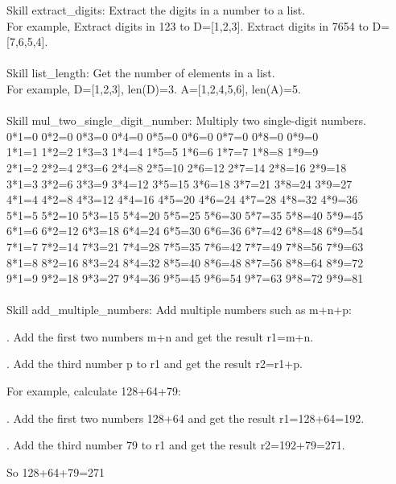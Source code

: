 \documentclass{article} \usepackage{arxiv}
\begin{document}
\newpage

\begin{tcolorbox}[title = {Skills for Multiplication}, colback = Apricot!25!white, colframe = BrickRed!75!black] 
Skill extract\_digits: Extract the digits in a number to a list.  \\
For example, Extract digits in 123 to D=[1,2,3]. Extract digits in 7654 to D=[7,6,5,4]. \\ \\

Skill list\_length: Get the number of elements in a list.  \\
For example, D=[1,2,3], len(D)=3. A=[1,2,4,5,6], len(A)=5. \\ \\

Skill mul\_two\_single\_digit\_number: Multiply two single-digit numbers.  \\
0*1=0 0*2=0 0*3=0 0*4=0 0*5=0 0*6=0 0*7=0 0*8=0 0*9=0 \\
1*1=1 1*2=2 1*3=3 1*4=4 1*5=5 1*6=6 1*7=7 1*8=8 1*9=9 \\
2*1=2 2*2=4 2*3=6 2*4=8 2*5=10 2*6=12 2*7=14 2*8=16 2*9=18 \\
3*1=3 3*2=6 3*3=9 3*4=12 3*5=15 3*6=18 3*7=21 3*8=24 3*9=27 \\
4*1=4 4*2=8 4*3=12 4*4=16 4*5=20 4*6=24 4*7=28 4*8=32 4*9=36 \\
5*1=5 5*2=10 5*3=15 5*4=20 5*5=25 5*6=30 5*7=35 5*8=40 5*9=45 \\
6*1=6 6*2=12 6*3=18 6*4=24 6*5=30 6*6=36 6*7=42 6*8=48 6*9=54 \\
7*1=7 7*2=14 7*3=21 7*4=28 7*5=35 7*6=42 7*7=49 7*8=56 7*9=63 \\
8*1=8 8*2=16 8*3=24 8*4=32 8*5=40 8*6=48 8*7=56 8*8=64 8*9=72 \\
9*1=9 9*2=18 9*3=27 9*4=36 9*5=45 9*6=54 9*7=63 9*8=72 9*9=81 \\ \\

Skill add\_multiple\_numbers: Add multiple numbers such as m+n+p: 


. Add the first two numbers m+n and get the result r1=m+n. 

. Add the third number p to r1 and get the result r2=r1+p.  

For example, calculate 128+64+79: 

. Add the first two numbers 128+64 and get the result r1=128+64=192. 

. Add the third number 79 to r1 and get the result r2=192+79=271. 

\quad So 128+64+79=271       
\end{tcolorbox}
\noindent\begin{minipage}{\textwidth}  
 \label{Tab:simple_mul_skill}
\end{minipage}
\end{document}
